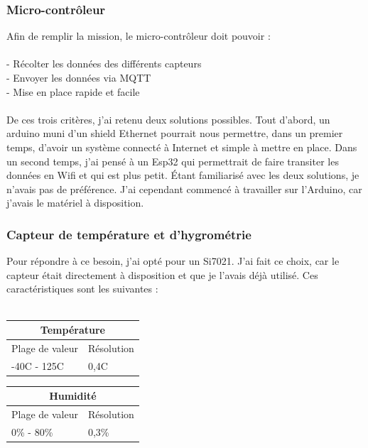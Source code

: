\documentclass[12pt,french,a4paper]{article}
\begin{document}
\subsubsection{Micro-contrôleur}

Afin de remplir la mission, le micro-contrôleur doit pouvoir :\\
\\
	- Récolter les données des différents capteurs\\
	- Envoyer les données via MQTT\\
	- Mise en place rapide et facile\\
	\\
De ces trois critères, j'ai retenu deux solutions possibles. 
Tout d'abord, un arduino muni d'un shield Ethernet pourrait nous permettre, dans un premier temps, d'avoir un système 
connecté à Internet et simple à mettre en place.
Dans un second temps, j'ai pensé à un Esp32 qui permettrait de faire transiter les données en Wifi et qui est plus petit. 
Étant familiarisé avec les deux solutions, je n'avais pas de préférence. J'ai cependant commencé à travailler sur l'Arduino, car j'avais le matériel à disposition.

\subsubsection{Capteur de température et d'hygrométrie }
Pour répondre à ce besoin, j'ai opté pour un Si7021. J'ai fait ce choix, car le capteur était directement à disposition et que je l'avais déjà utilisé. Ces caractéristiques sont les suivantes :\\
\\
\begin{center}
    \begin{tabular}{|l|l|}
	\hline
	    \multicolumn{2}{|c|}{Température} \\
	\hline
	    Plage de valeur & Résolution \\
	\hline
	    -40C - 125C & 0,4C \\
	\hline
    \end{tabular}
\end{center}
\begin{center}
    \begin{tabular}{|l|l|}
	\hline
	    \multicolumn{2}{|c|}{Humidité} \\
	\hline
	    Plage de valeur & Résolution \\
	\hline
	    0\% - 80\% & 0,3\% \\
	\hline
    \end{tabular}
\end{center}
\end{document}
